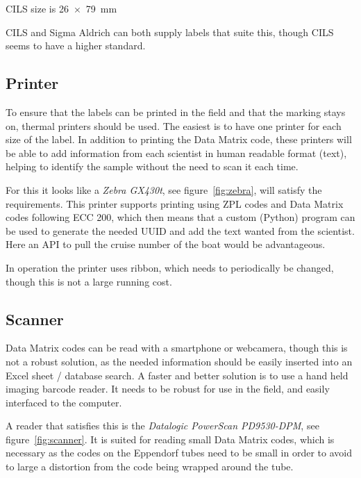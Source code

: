 \documentclass[a4paper,english, 11pt]{article}
\begin{document}
CILS size is \SI{26x79}{\mm}

CILS and Sigma Aldrich can both supply labels that suite this, though CILS seems to have a higher standard.

\subsection{Printer} %
\label{sub:Printer}
To ensure that the labels can be printed in the field and that the marking stays on, thermal printers should be used. The easiest is to have one printer for each size of the label. In addition to printing the Data Matrix code, these printers will be able to add information from each scientist in human readable format (text), helping to identify the sample without the need to scan it each time.

For this it looks like a \emph{Zebra GX430t}, see figure~\ref{fig:zebra}, will satisfy the requirements. This printer supports printing using ZPL codes and Data Matrix codes following ECC 200, which then means that a custom (Python) program can be used to generate the needed UUID and add the text wanted from the scientist. Here an API to pull the cruise number of the boat would be advantageous. 

In operation the printer uses ribbon, which needs to periodically be changed, though this is not a large running cost.
\subsection{Scanner} %
\label{sub:Scanner}

Data Matrix codes can be read with a smartphone or webcamera, though this is not a robust solution, as the needed information should be easily inserted into an Excel sheet / database search. A faster and better solution is to use a hand held imaging barcode reader. It needs to be robust for use in the field, and easily interfaced to the computer.

A reader that satisfies this is the \emph{Datalogic PowerScan PD9530-DPM}, see figure~\ref{fig:scanner}. It is suited for reading small Data Matrix codes, which is necessary as the codes on the Eppendorf tubes need to be small in order to avoid to large a distortion from the code being wrapped around the tube. 

\appendix
\end{document}
